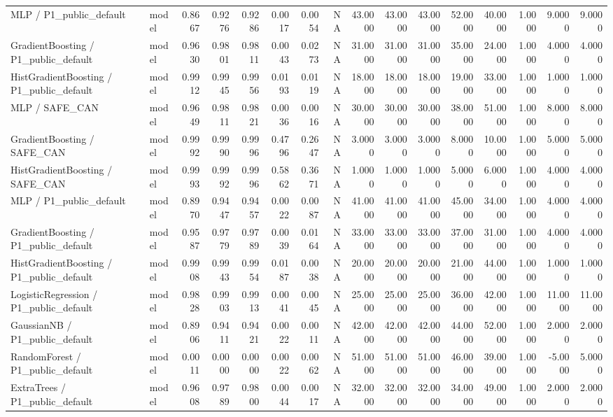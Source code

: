 \begin{tabular}{llrrrrrrrrrrrrrr}
MLP / P1\_public\_default & model & 0.8667 & 0.9276 & 0.9286 & 0.0017 & 0.0054 & NA & 43.0000 & 43.0000 & 43.0000 & 52.0000 & 40.0000 & 1.0000 & 9.0000 & 9.0000 \\
GradientBoosting / P1\_public\_default & model & 0.9630 & 0.9801 & 0.9811 & 0.0043 & 0.0273 & NA & 31.0000 & 31.0000 & 31.0000 & 35.0000 & 24.0000 & 1.0000 & 4.0000 & 4.0000 \\
HistGradientBoosting / P1\_public\_default & model & 0.9912 & 0.9945 & 0.9956 & 0.0193 & 0.0119 & NA & 18.0000 & 18.0000 & 18.0000 & 19.0000 & 33.0000 & 1.0000 & 1.0000 & 1.0000 \\
MLP / SAFE\_CAN & model & 0.9649 & 0.9811 & 0.9821 & 0.0036 & 0.0016 & NA & 30.0000 & 30.0000 & 30.0000 & 38.0000 & 51.0000 & 1.0000 & 8.0000 & 8.0000 \\
GradientBoosting / SAFE\_CAN & model & 0.9992 & 0.9990 & 0.9996 & 0.4796 & 0.2647 & NA & 3.0000 & 3.0000 & 3.0000 & 8.0000 & 10.0000 & 1.0000 & 5.0000 & 5.0000 \\
HistGradientBoosting / SAFE\_CAN & model & 0.9993 & 0.9992 & 0.9996 & 0.5862 & 0.3671 & NA & 1.0000 & 1.0000 & 1.0000 & 5.0000 & 6.0000 & 1.0000 & 4.0000 & 4.0000 \\
MLP / P1\_public\_default & model & 0.8970 & 0.9447 & 0.9457 & 0.0022 & 0.0087 & NA & 41.0000 & 41.0000 & 41.0000 & 45.0000 & 34.0000 & 1.0000 & 4.0000 & 4.0000 \\
GradientBoosting / P1\_public\_default & model & 0.9587 & 0.9779 & 0.9789 & 0.0039 & 0.0164 & NA & 33.0000 & 33.0000 & 33.0000 & 37.0000 & 31.0000 & 1.0000 & 4.0000 & 4.0000 \\
HistGradientBoosting / P1\_public\_default & model & 0.9908 & 0.9943 & 0.9954 & 0.0187 & 0.0038 & NA & 20.0000 & 20.0000 & 20.0000 & 21.0000 & 44.0000 & 1.0000 & 1.0000 & 1.0000 \\
LogisticRegression / P1\_public\_default & model & 0.9828 & 0.9903 & 0.9913 & 0.0041 & 0.0045 & NA & 25.0000 & 25.0000 & 25.0000 & 36.0000 & 42.0000 & 1.0000 & 11.0000 & 11.0000 \\
GaussianNB / P1\_public\_default & model & 0.8906 & 0.9411 & 0.9421 & 0.0022 & 0.0011 & NA & 42.0000 & 42.0000 & 42.0000 & 44.0000 & 52.0000 & 1.0000 & 2.0000 & 2.0000 \\
RandomForest / P1\_public\_default & model & 0.0011 & 0.0000 & 0.0000 & 0.0022 & 0.0062 & NA & 51.0000 & 51.0000 & 51.0000 & 46.0000 & 39.0000 & 1.0000 & -5.0000 & 5.0000 \\
ExtraTrees / P1\_public\_default & model & 0.9608 & 0.9789 & 0.9800 & 0.0044 & 0.0017 & NA & 32.0000 & 32.0000 & 32.0000 & 34.0000 & 49.0000 & 1.0000 & 2.0000 & 2.0000 \\

\end{tabular}
